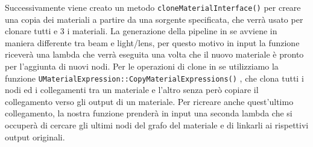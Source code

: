 \documentclass[main.tex]{subfiles}
\begin{document}
Successivamente viene creato un metodo \lstinline{cloneMaterialInterface()} per creare una copia dei materiali a partire da una sorgente specificata, che verrà usato per clonare tutti e 3 i materiali. La generazione della pipeline in se avviene in maniera differente tra beam e light/lens, per questo motivo in input la funzione riceverà una lambda che verrà eseguita una volta che il nuovo materiale è pronto per l'aggiunta di nuovi nodi. Per le operazioni di clone in se utilizziamo la funzione \lstinline{UMaterialExpression::CopyMaterialExpressions()} \cite{CopyMaterialExpressions}, che clona tutti i nodi ed i collegamenti tra un materiale e l'altro senza però copiare il collegamento verso gli output di un materiale. Per ricreare anche quest'ultimo collegamento, la nostra funzione prenderà in input una seconda lambda che si occuperà di cercare gli ultimi nodi del grafo del materiale e di linkarli ai rispettivi output originali.
\end{document}
